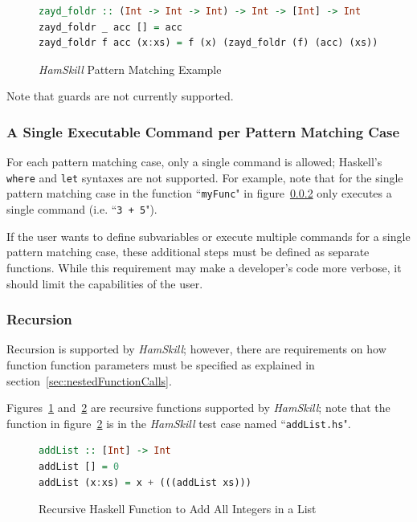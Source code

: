 \documentclass{report}
\begin{document}
\begin{figure}[H]
\begin{mdframed}
\begin{lstlisting}[basicstyle=\small, language=Haskell]
zayd_foldr :: (Int -> Int -> Int) -> Int -> [Int] -> Int
zayd_foldr _ acc [] = acc
zayd_foldr f acc (x:xs) = f (x) (zayd_foldr (f) (acc) (xs))
\end{lstlisting}
\end{mdframed}
\caption{\textit{HamSkill} Pattern Matching Example}\label{fig:functionZaydFoldr}
\end{figure}

Note that guards are not currently supported.

\subsubsection{A Single Executable Command per Pattern Matching Case}

For each pattern matching case, only a single command is allowed; Haskell's \texttt{where} and \texttt{let} syntaxes are not supported.  For example, note that for the single pattern matching case in the function ``\texttt{myFunc}" in figure~\ref{} only executes a single command (i.e. ``\texttt{3 + 5}").

If the user wants to define subvariables or execute multiple commands for a single pattern matching case, these additional steps must be defined as separate functions.  While this requirement may make a developer's code more verbose, it should limit the capabilities of the user.

\subsubsection{Recursion}

Recursion is supported by \textit{HamSkill}; however, there are requirements on how function function parameters must be specified as explained in section~\ref{sec:nestedFunctionCalls}.

Figures~\ref{fig:functionZaydFoldr} and~\ref{fig:functionAddList} are recursive functions supported by \textit{HamSkill}; note that the function in figure~\ref{fig:functionAddList} is in the \textit{HamSkill} test case named ``\texttt{addList.hs}".

\begin{figure}[H]
\begin{mdframed}
\begin{lstlisting}[language=Haskell]
addList :: [Int] -> Int
addList [] = 0
addList (x:xs) = x + (((addList xs)))
\end{lstlisting}
\end{mdframed}
\caption{Recursive Haskell Function to Add All Integers in a List}\label{fig:functionAddList}
\end{figure}
\end{document}

